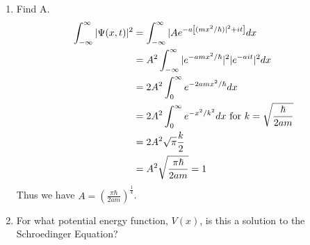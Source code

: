 \documentclass{article}
\newcommand{\bracket}[1]{\left[ #1 \right]}
\newcommand{\paren}[1]{\left( #1 \right)}
\begin{document}
\begin{enumerate}[label=(\alph*)]
  \item Find A.
    \begin{align*}
      \intinf |\Psi(x,t)|^2 &= \intinf |Ae^{-a\bracket{(mx^2/\hbar)|^2 + it}}dx \\
                            &=  A^2\intinf |e^{-amx^2/\hbar}|^2 |e^{-ait}|^2 dx \\
                            &= 2A^2 \intzinf e^{-2amx^2/\hbar}dx \\
                            &= 2A^2 \intzinf e^{-x^2/k^2}dx \text{ for } k = \sqrt{\frac\hbar{2am}} \\
                            &= 2A^2 \sqrt{\pi} \frac{k}{2} \\
                            &= A^2 \sqrt{\frac{\pi\hbar}{2am}} = 1
    \end{align*}
    Thus we have $A = \paren{\frac{\pi\hbar}{2am}}^{\frac14}$.
  \item For what potential energy function, $V(x)$, is this a solution to the Schroedinger Equation?

\end{enumerate}
\end{document}
